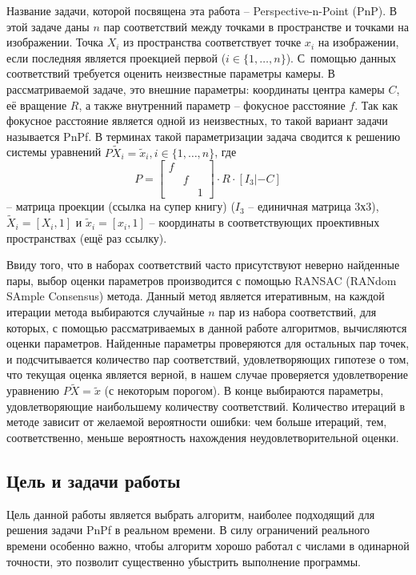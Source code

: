 \documentclass[%
bachelor,    %
natbib,      %
subf,        %
href,        %
colorlinks,  %
]{disser}
\begin{document}
Название задачи, которой посвящена эта работа -- Perspective-n-Point (PnP).
В этой задаче даны $n$ пар соответствий между точками в пространстве и точками на изображении. 
Точка $X_i$ из пространства соответствует точке $x_i$ на изображении, если последняя является проекцией первой ($i\in\{1,\ldots ,n\}$).
С~помощью данных соответствий требуется оценить неизвестные параметры камеры.
В рассматриваемой задаче, это внешние параметры: координаты центра камеры $C$, её вращение $R$, а также внутренний параметр -- фокусное расстояние $f$.
Так как фокусное расстояние является одной из неизвестных, то такой вариант задачи называется PnPf.
В терминах такой параметризации задача сводится к решению системы уравнений $P\widetilde{X}_i = \widetilde{x}_i, i\in\{1,\ldots ,n\}$, где 
\begin{equation*}
    P = \begin{bmatrix}
    f & & \\
    & f & \\
    & & 1
  \end{bmatrix}\cdot R\cdot[I_3|-C]
\end{equation*}
 -- матрица проекции (ссылка на супер книгу) ($I_3$ -- единичная матрица 3х3), $\widetilde{X}_i = [X_i, 1]$ и $\widetilde{x}_i = [x_i, 1]$ -- координаты в соответствующих проективных пространствах (ещё раз ссылку).

Ввиду того, что в наборах соответствий часто присутствуют неверно найденные пары, выбор оценки параметров производится с помощью RANSAC (RANdom SAmple Consensus) метода. 
Данный метод является итеративным, на каждой итерации метода выбираются случайные $n$ пар из набора соответствий, для которых, с помощью рассматриваемых в данной работе алгоритмов, вычисляются оценки параметров. 
Найденные параметры проверяются для остальных пар точек, и подсчитывается количество пар соответствий, удовлетворяющих гипотезе о том, что текущая оценка является верной, в нашем случае проверяется удовлетворение уравнению $P\widetilde X = \widetilde x$ (с некоторым порогом). В конце выбираются параметры, удовлетворяющие наибольшему количеству соответствий. Количество итераций в методе зависит от желаемой вероятности ошибки: чем больше итераций, тем, соответственно, меньше вероятность нахождения неудовлетворительной оценки.

\subsection{Цель и задачи работы}
Цель данной работы является выбрать алгоритм, наиболее подходящий для решения задачи PnPf в реальном времени.
В силу ограничений реального времени особенно важно, чтобы алгоритм хорошо работал с числами в одинарной точности, это позволит существенно убыстрить выполнение программы.
\end{document}
